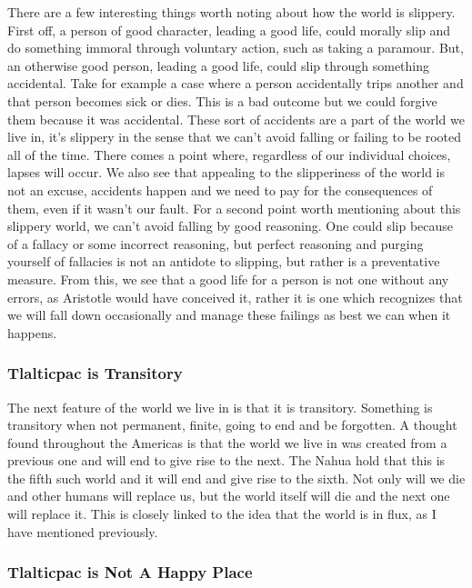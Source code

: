 There are a few interesting things worth noting about how the world is slippery. First off, a person of good character, leading a good life, could morally slip and do something immoral through voluntary action, such as taking a paramour. But, an otherwise good person, leading a good life, could slip through something accidental. Take for example a case where a person accidentally trips another and that person becomes sick or dies. This is a bad outcome but we could forgive them because it was accidental. These sort of accidents are a part of the world we live in, it's slippery in the sense that we can't avoid falling or failing to be rooted all of the time. There comes a point where, regardless of our individual choices, lapses will occur. We also see that appealing to the slipperiness of the world is not an excuse, accidents happen and we need to pay for the consequences of them, even if it wasn't our fault. For a second point worth mentioning about this slippery world, we can't avoid falling by good reasoning. One could slip because of a fallacy or some incorrect reasoning, but perfect reasoning and purging yourself of fallacies is not an antidote to slipping, but rather is a preventative measure. From this, we see that a good life for a person is not one without any errors, as Aristotle would have conceived it, rather it is one which recognizes that we will fall down occasionally and manage these failings as best we can when it happens.  

\subsubsection{Tlalticpac is Transitory}

The next feature of the world we live in is that it is transitory. Something is transitory when not permanent, finite, going to end and be forgotten. A thought found throughout the Americas is that the world we live in was created from a previous one and will end to give rise to the next. The Nahua hold that this is the fifth such world and it will end and give rise to the sixth. Not only will we die and other humans will replace us, but the world itself will die and the next one will replace it. This is closely linked to the idea that the world is in flux, as I have mentioned previously.


\subsubsection{Tlalticpac is Not A Happy Place}

